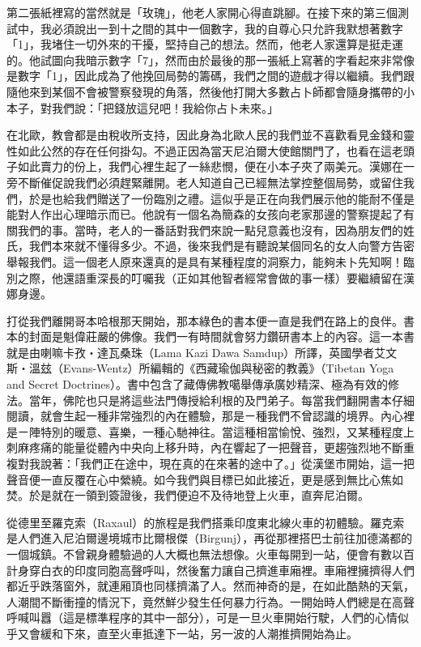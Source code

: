 第二張紙裡寫的當然就是「玫瑰」，他老人家開心得直跳腳。在接下來的第三個測試中，我必須說出一到十之間的其中一個數字，我的自尊心只允許我默想著數字「1」，我堵住一切外來的干擾，堅持自己的想法。然而，他老人家還算是挺走運的。他試圖向我暗示數字「7」，然而由於最後的那一張紙上寫著的字看起來非常像是數字「1」，因此成為了他挽回局勢的籌碼，我們之間的遊戲才得以繼續。我們跟隨他來到某個不會被警察發現的角落，然後他打開大多數占卜師都會隨身攜帶的小本子，對我們說：「把錢放這兒吧！我給你占卜未來。」

在北歐，教會都是由稅收所支持，因此身為北歐人民的我們並不喜歡看見金錢和靈性如此公然的存在任何掛勾。不過正因為當天尼泊爾大使館關門了，也看在這老頭子如此賣力的份上，我們心裡生起了一絲悲憫，便在小本子夾了兩美元。漢娜在一旁不斷催促說我們必須趕緊離開。老人知道自己已經無法掌控整個局勢，或留住我們，於是也給我們贈送了一份臨別之禮。這似乎是正在向我們展示他的能耐不僅是能對人作出心理暗示而已。他說有一個名為簡森的女孩向老家那邊的警察提起了有關我們的事。當時，老人的一番話對我們來說一點兒意義也沒有，因為朋友們的姓氏，我們本來就不懂得多少。不過，後來我們是有聽說某個同名的女人向警方告密舉報我們。這一個老人原來還真的是具有某種程度的洞察力，能夠未卜先知啊！臨別之際，他還語重深長的叮囑我（正如其他智者經常會做的事一樣）要繼續留在漢娜身邊。

打從我們離開哥本哈根那天開始，那本綠色的書本便一直是我們在路上的良伴。書本的封面是魁偉莊嚴的佛像。我們一有時間就會努力鑽研書本上的內容。這一本書就是由喇嘛卡孜‧達瓦桑珠（Lama
Kazi Dawa
Samdup）所譯，英國學者艾文斯‧溫玆（Evans-Wentz）所編輯的《西藏瑜伽與秘密的教義》（Tibetan
Yoga and Secret
Doctrines）。書中包含了藏傳佛教噶舉傳承廣妙精深、極為有效的修法。當年，佛陀也只是將這些法門傳授給利根的及門弟子。每當我們翻開書本仔細閱讀，就會生起一種非常強烈的內在體驗，那是ㄧ種我們不曾認識的境界。內心裡是ㄧ陣特別的暖意、喜樂，一種心馳神往。當這種相當愉悅、強烈，又某種程度上刺麻疼痛的能量從體內中央向上移升時，內在響起了一把聲音，更趨強烈地不斷重複對我說著：「我們正在途中，現在真的在來著的途中了。」從漢堡市開始，這一把聲音便一直反覆在心中縈繞。如今我們與目標已如此接近，更是感到無比心焦如焚。於是就在一領到簽證後，我們便迫不及待地登上火車，直奔尼泊爾。

從德里至羅克索（Raxaul）的旅程是我們搭乘印度東北線火車的初體驗。羅克索是人們進入尼泊爾邊境城市比爾根傑（Birgunj），再從那裡搭巴士前往加德滿都的一個城鎮。不曾親身體驗過的人大概也無法想像。火車每開到一站，便會有數以百計身穿白衣的印度同胞高聲呼叫，然後奮力讓自己擠進車廂裡。車廂裡擁擠得人們都近乎跌落窗外，就連厢頂也同樣擠滿了人。然而神奇的是，在如此酷熱的天氣，人潮間不斷衝撞的情況下，竟然鮮少發生任何暴力行為。一開始時人們總是在高聲呼喊叫囂（這是標準程序的其中一部分），可是一旦火車開始行駛，人們的心情似乎又會緩和下來，直至火車抵達下一站，另一波的人潮推擠開始為止。

